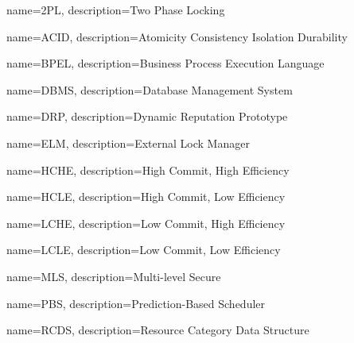 \usepackage[
nonumberlist,
nogroupskip,
toc]
{glossaries}
\makeglossaries
{}
{
    name=2PL,
    description={Two Phase Locking}
}

{
    name=ACID,
    description={Atomicity Consistency Isolation Durability}
}

{
    name=BPEL,
    description={Business Process Execution Language}
}

{
    name=DBMS,
    description={Database Management System}
}

{
    name=DRP,
    description={Dynamic Reputation Prototype}
}

{
    name=ELM,
    description={External Lock Manager}
}

{
    name=HCHE,
    description={High Commit, High Efficiency}
}

{
    name=HCLE,
    description={High Commit, Low Efficiency}
}

{
    name=LCHE,
    description={Low Commit, High Efficiency}
}

{
    name=LCLE,
    description={Low Commit, Low Efficiency}
}

{
    name=MLS,
    description={Multi-level Secure}
}

{
    name=PBS,
    description={Prediction-Based Scheduler}
}

{
    name=RCDS,
    description={Resource Category Data Structure}
}